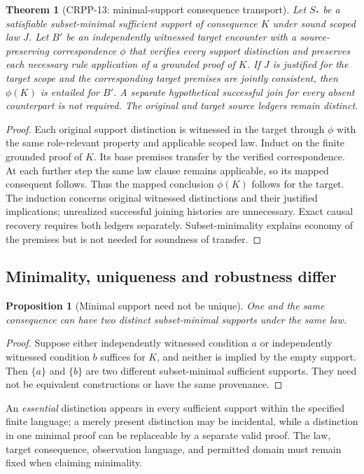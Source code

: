 \documentclass[11pt]{article}
\newtheorem{proposition}[definition]{Proposition}
\newtheorem{theorem}[definition]{Theorem}
\begin{document}
\begin{theorem}[CRPP-13: minimal-support consequence transport]
Let $S_*$ be a satisfiable subset-minimal sufficient
support of consequence $K$ under sound scoped law $J$.
Let $B'$ be an independently witnessed target
encounter with a source-preserving correspondence
$\phi$ that verifies every support distinction and
preserves each necessary rule application of a
grounded proof of $K$. If $J$ is justified for the
target scope and the corresponding target premises
are jointly consistent, then $\phi(K)$ is entailed
for $B'$. A separate hypothetical successful join
for every absent counterpart is not required.
The original and target source ledgers remain distinct.
\end{theorem}
\begin{proof}
Each original support distinction is witnessed in
the target through $\phi$ with the same role-relevant
property and applicable scoped law. Induct on the
finite grounded proof of $K$. Its base premises
transfer by the verified correspondence. At each
further step the same law clause remains applicable,
so its mapped consequent follows. Thus the mapped
conclusion $\phi(K)$ follows for the target.
The induction concerns original witnessed distinctions
and their justified implications; unrealized successful
joining histories are unnecessary. Exact causal
recovery requires both ledgers separately.
Subset-minimality explains economy of the premises
but is not needed for soundness of transfer.
\end{proof}

\subsection{Minimality, uniqueness and robustness differ}
\begin{proposition}[Minimal support need not be unique]
One and the same consequence can have two distinct
subset-minimal supports under the same law.
\end{proposition}
\begin{proof}
Suppose either independently witnessed condition $a$
or independently witnessed condition $b$ suffices
for $K$, and neither is implied by the empty support.
Then $\{a\}$ and $\{b\}$ are two different
subset-minimal sufficient supports. They need not
be equivalent constructions or have the same provenance.
\end{proof}

An \emph{essential} distinction appears in every sufficient
support within the specified finite language; a merely
present distinction may be incidental, while a distinction
in one minimal proof can be replaceable by a separate
valid proof. The law, target consequence, observation
language, and permitted domain must remain fixed
when claiming minimality.
\end{document}
